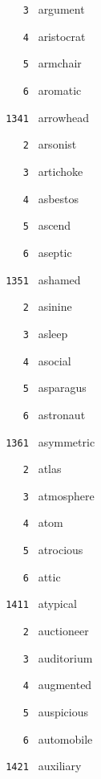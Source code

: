 \documentclass[11pt]{article}
\begin{document}
\begin{multicols}{6}
\noindent \texttt{ \ \ \ 3 } argument  \par
\noindent \texttt{ \ \ \ 4 } aristocrat  \par
\noindent \texttt{ \ \ \ 5 } armchair  \par
\noindent \texttt{ \ \ \ 6 } aromatic  \par
\vspace{3mm}
\noindent \texttt{ 1341 } arrowhead  \par
\noindent \texttt{ \ \ \ 2 } arsonist  \par
\noindent \texttt{ \ \ \ 3 } artichoke  \par
\noindent \texttt{ \ \ \ 4 } asbestos  \par
\noindent \texttt{ \ \ \ 5 } ascend  \par
\noindent \texttt{ \ \ \ 6 } aseptic  \par
\vspace{3mm}
\noindent \texttt{ 1351 } ashamed  \par
\noindent \texttt{ \ \ \ 2 } asinine  \par
\noindent \texttt{ \ \ \ 3 } asleep  \par
\noindent \texttt{ \ \ \ 4 } asocial  \par
\noindent \texttt{ \ \ \ 5 } asparagus  \par
\noindent \texttt{ \ \ \ 6 } astronaut  \par
\vspace{3mm}
\noindent \texttt{ 1361 } asymmetric  \par
\noindent \texttt{ \ \ \ 2 } atlas  \par
\noindent \texttt{ \ \ \ 3 } atmosphere  \par
\noindent \texttt{ \ \ \ 4 } atom  \par
\noindent \texttt{ \ \ \ 5 } atrocious  \par
\noindent \texttt{ \ \ \ 6 } attic  \par
\noindent \texttt{ 1411 } atypical  \par
\noindent \texttt{ \ \ \ 2 } auctioneer  \par
\noindent \texttt{ \ \ \ 3 } auditorium  \par
\noindent \texttt{ \ \ \ 4 } augmented  \par
\noindent \texttt{ \ \ \ 5 } auspicious  \par
\noindent \texttt{ \ \ \ 6 } automobile  \par
\vspace{3mm}
\noindent \texttt{ 1421 } auxiliary  \par

\end{multicols}
\end{document}
